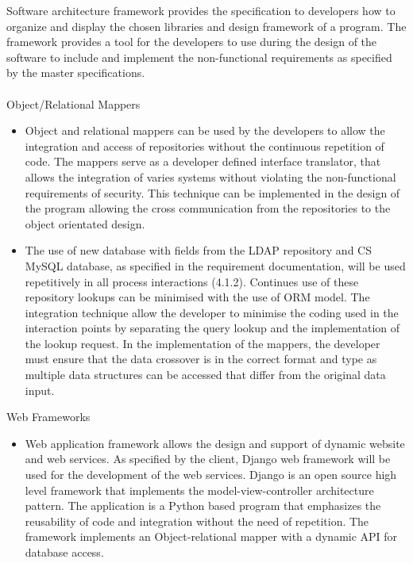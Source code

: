 \documentclass[12pt]{article}
\begin{document}
							 Software architecture framework provides the specification to developers how to organize and display the chosen libraries and design framework of a program. The framework provides a tool for the developers to use during the design of the software to include and implement the non-functional requirements as specified by the master specifications.
							\\
							\\ Object/Relational Mappers
							\begin{itemize}
								 \item Object and relational mappers can be used by the developers to allow the integration and access of repositories without the continuous repetition of code. The mappers serve as a developer defined interface translator, that allows the integration of varies systems without violating the non-functional requirements of security. This technique can be implemented in the design of the program allowing the cross communication from the repositories to the object orientated design.
								
								\item The use of new database with fields from the LDAP repository and CS MySQL database, as specified in the requirement documentation, will be used repetitively in all process interactions (4.1.2). Continues use of these repository lookups can be minimised with the use of ORM model. The integration technique allow the developer to minimise the coding used in the interaction points by separating the query lookup and the implementation of the lookup request. In the implementation of the mappers, the developer must ensure that the data crossover is in the correct format and type as multiple data structures can be accessed that differ from the original data input.
							\end{itemize}
							 Web Frameworks
							\begin{itemize}
								\item Web application framework allows the design and support of dynamic website and web services. As specified by the client, Django web framework will be used for the development of the web services. Django is an open source high level framework that implements the model-view-controller architecture pattern. The application is a Python based program that emphasizes the reusability of code and integration without the need of repetition. The framework implements an Object-relational mapper with a dynamic API for database access.
								
							\end{itemize}
\end{document}
